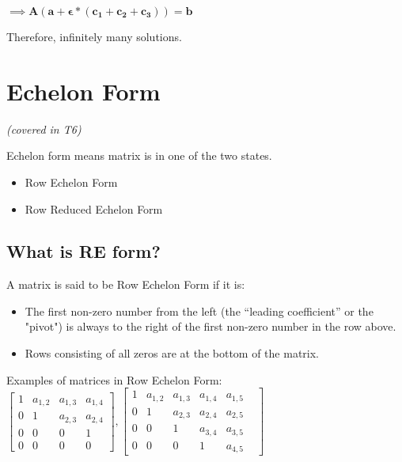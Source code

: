 \documentclass[a4paper]{article}
\begin{document}
\begin{center}
$
    \implies \mathbf{A(a+\epsilon*(\mathbf{c_1} + \mathbf{c_2} + \mathbf{c_3}))} = \mathbf{b}
$
\end{center}

Therefore, infinitely many solutions.


\section{Echelon Form}
\textit{(covered in T6)}

Echelon form means matrix is in one of the two states. 
\begin{itemize}
  \item Row Echelon Form
  \item Row Reduced Echelon Form
\end{itemize}


\subsection{What is RE form?}
A matrix is said to be Row Echelon Form if it is:
\begin{itemize}
  \item The first non-zero number from the left (the “leading coefficient” or the "pivot") is always to the right of the first non-zero number in the row above.
  \item Rows consisting of all zeros are at the bottom of the matrix.
\end{itemize}
Examples of matrices in Row Echelon Form:
$ 
    \begin{bmatrix}
    1 & a_{1,2} & a_{1,3} & a_{1,4} \\ 
    0 & 1 &  a_{2,3} & a_{2,4} \\
    0 & 0 & 0  &    1  \\
    0 & 0 & 0 & 0 
    \end{bmatrix}
    ,
    \begin{bmatrix}
    1 & a_{1,2} & a_{1,3} & a_{1,4} & a_{1,5} \\ 
    0 & 1 &  a_{2,3} & a_{2,4} & a_{2,5} \\
    0 & 0 & 1  & a_{3,4} & a_{3,5}  \\
    0 & 0 & 0 & 1 &  a_{4,5} &
    \end{bmatrix}
$
\end{document}

